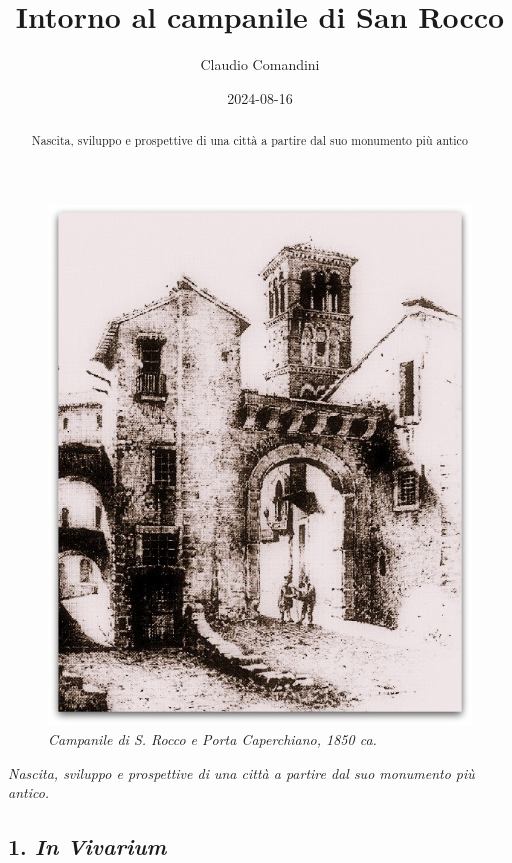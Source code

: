 \documentclass[
  letterpaper,
  DIV=11,
  numbers=noendperiod]{scrartcl}
\title{Intorno al campanile di San Rocco}
\author{Claudio Comandini}
\date{2024-08-16}
\begin{document}
\maketitle
\begin{abstract}
Nascita, sviluppo e prospettive di una città a partire dal suo monumento
più antico
\end{abstract}

\begin{figure}[H]

{\centering \includegraphics{../../images/2024/san_rocco/1CampanileSRoccoPortaCapestrano.jpg}

}

\caption{\emph{Campanile di S. Rocco e Porta Caperchiano, 1850 ca.}}

\end{figure}%

\emph{Nascita, sviluppo e prospettive di una città a partire dal suo
monumento più antico.}

\subsection{\texorpdfstring{1. \emph{In
Vivarium}}{1. In Vivarium}}\label{in-vivarium}
\end{document}
